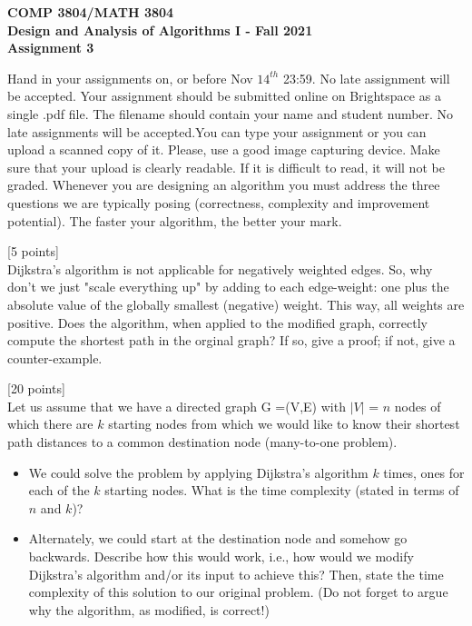 \documentclass[12pt]{article}
\newcounter{ques}
\newenvironment{question}{\stepcounter{ques}{\noindent\bf Question \arabic{ques}:}}{\vspace{5mm}}
\begin{document}
\begin{center} \large\bf
COMP 3804/MATH 3804\\
Design and Analysis of Algorithms I  -
Fall  2021\\
Assignment 3
\end{center}

Hand in your assignments on, or before
Nov $14^{th}$ 23:59. No late assignment will be accepted. Your assignment should be submitted online on Brightspace as a single .pdf file.  The filename should contain your name and student number. No late assignments will be accepted.You can type your assignment or you can upload a scanned copy of it.  Please, use a good image capturing device. Make sure that your upload is clearly readable. If it is difficult to read, it will not be graded. Whenever you are designing an algorithm you must address the three questions we are
typically posing (correctness, complexity and improvement potential).
The faster your
algorithm, the better your mark.     \\

\vspace{1em}

\begin{question}[5 points]\\
Dijkstra's algorithm is not applicable  for negatively weighted edges. So, why don't we just "scale everything up" by adding to each edge-weight: one plus  the absolute value of the globally smallest (negative) weight. This way, all weights are positive. Does the algorithm, when applied to the modified graph,  correctly compute the shortest path in the orginal graph? If so, give a proof;   if not, give a counter-example.

\end{question}

\begin{question}[20 points]\\
 Let us assume that we have a directed graph G =(V,E) with $|V|$  = $n$ nodes of which there are $k$ starting nodes from which we would like to know their shortest path distances to a common destination node (many-to-one problem).

 \begin{itemize}
 	\item We could solve the problem by applying Dijkstra's algorithm $k$ times, ones for each of the $k$ starting nodes. What is the time  complexity (stated in terms of $n$ and $k$)?
 	\item Alternately, we could  start at the destination node and  somehow go backwards. Describe how this would work, i.e., how would we modify Dijkstra's algorithm and/or its input to achieve this?  Then, state the time complexity of this solution to our original problem. (Do not forget to argue why the algorithm, as modified, is correct!)
 \end{itemize}
\end{question}
\end{document}
